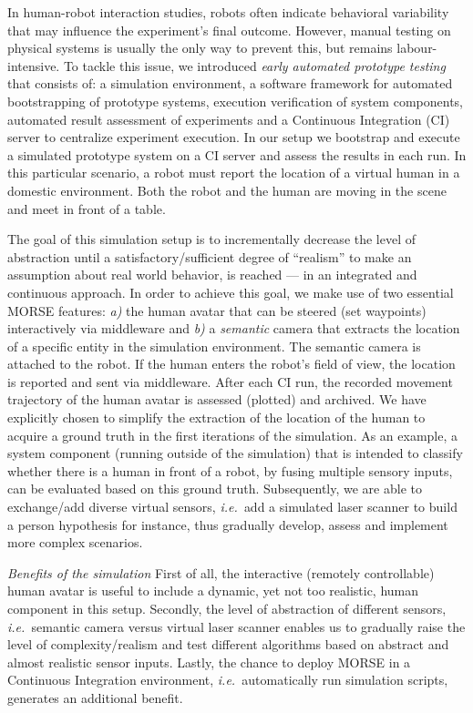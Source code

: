 \documentclass{llncs}
\newcommand{\ie}{{\textit{i.e.~}}}
\begin{document}
In human-robot interaction studies, robots often indicate behavioral variability
that may influence the experiment's final outcome.  However, manual testing on
physical systems is usually the only way to prevent this, but remains
labour-intensive. To tackle this issue, we introduced \emph{early automated
prototype testing}~\cite{2645922} that consists of: a simulation environment, a
software framework for automated bootstrapping of prototype systems, execution
verification of system components, automated result assessment of experiments
and a Continuous Integration (CI) server to centralize experiment execution. In
our setup we bootstrap and execute a simulated prototype system on a CI server
and assess the results in each run. In this particular scenario, a robot must
report the location of a virtual human in a domestic environment. Both the
robot and the human are moving in the scene and meet in front of a table.


The goal of this simulation setup is to incrementally decrease the level of
abstraction until a satisfactory/sufficient degree of ``realism'' to make an
assumption about real world behavior, is reached --- in an integrated and
continuous approach. In order to achieve this goal, we make use of two essential
MORSE features: \textit{a)} the human avatar that can be steered (set waypoints)
interactively via middleware and \textit{b)} a \emph{semantic} camera that
extracts the location of a specific entity in the simulation environment. The
semantic camera is attached to the robot. If the human enters the robot's field
of view, the location is reported and sent via middleware. After each CI run,
the recorded movement trajectory of the human avatar is assessed (plotted) and
archived. We have explicitly chosen to simplify the extraction of the location
of the human to acquire a ground truth in the first iterations of the
simulation. As an example, a system component (running outside of the simulation) 
that is intended to classify whether there is a human in front of a robot, by fusing 
multiple sensory inputs, can be evaluated based on this ground truth. Subsequently, 
we are able to exchange/add diverse virtual sensors, \ie add a simulated laser 
scanner to build a person hypothesis for instance, thus gradually develop, 
assess and implement more complex scenarios.

\emph{Benefits of the simulation} First of all, the interactive (remotely
controllable) human avatar is useful to include a dynamic, yet not too
realistic, human component in this setup. Secondly, the level of abstraction of different
sensors, \ie semantic camera versus virtual laser scanner enables us to
gradually raise the level of complexity/realism and test different algorithms
based on abstract and almost realistic sensor inputs. Lastly, the chance to
deploy MORSE in a Continuous Integration environment, \ie automatically run
simulation scripts, generates an additional benefit.
 
\end{document}
